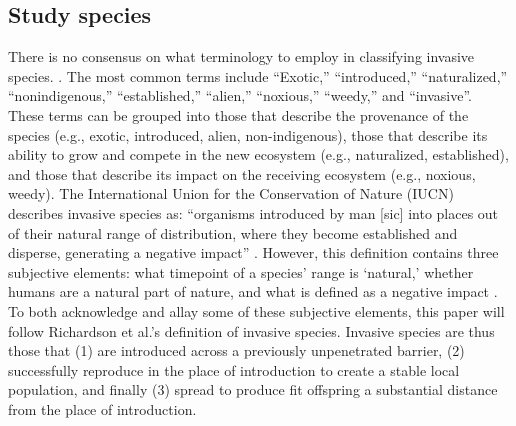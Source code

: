 \documentclass[12pt]{article}\usepackage[]{graphicx}\usepackage[]{color}
\begin{document}
	\subsection{Study species}
	There is no consensus on what terminology to employ in classifying invasive species.  \parencite{Colautti2004}. The most common terms include “Exotic,” “introduced,” “naturalized,” “nonindigenous,” “established,” “alien,” “noxious,” “weedy,” and “invasive”. These terms can be grouped into those that describe the provenance of the species (e.g., exotic, introduced, alien, non-indigenous), those that describe its ability to grow and compete in the new ecosystem (e.g., naturalized, established), and those that describe its impact on the receiving ecosystem (e.g., noxious, weedy). The International Union for the Conservation of Nature (IUCN) describes invasive species as: ``organisms introduced by man [sic] into places out of their natural range of distribution, where they become established and disperse, generating a negative impact” \parencite{IUCN2008is}. However, this definition contains three subjective elements: what timepoint of a species' range is `natural,' whether humans are a natural part of nature, and what is defined as a negative impact \parencite{Munro2019}. To both acknowledge and allay some of these subjective elements, this paper will follow Richardson et al.’s \parencite{Richardson2000,Richardson2011} definition of invasive species. Invasive species are thus those that (1) are introduced across a previously unpenetrated barrier, (2) successfully reproduce in the place of introduction to create a stable local population, and finally (3) spread to produce fit offspring a substantial distance from the place of introduction.
	
\end{document}
